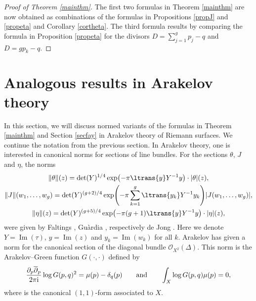 \documentclass[pdftex]{sigma}
\numberwithin{equation}{section}
\begin{document}
\begin{proof}[Proof of Theorem \ref{mainthm}]
	The first two formulas in Theorem \ref{mainthm} are now obtained as combinations of the formulas in Propositions \ref{propJ} and \ref{propeta} and Corollary \ref{cortheta}. The third formula results by comparing the formula in Proposition \ref{propeta} for the divisors $D=\sum_{j=1}^g p_j-q$ and $D=gp_k-q$.
\end{proof}

\section{Analogous results in Arakelov theory}\label{secarakelov}
In this section, we will discuss normed variants of the formulas in Theorem \ref{mainthm} and Section \ref{secfay} in Arakelov theory of Riemann surfaces. We continue the notation from the previous section.
In Arakelov theory, one is interested in canonical norms for sections of line bundles. For the sections $\theta$, $J$ and $\eta$, the norms
\begin{gather*}
\|\theta\|(z)=\det(Y)^{1/4}\exp\bigl(-\pi\ltrans{y}Y^{-1}y\bigr)\cdot |\theta|(z),\\
\|J\|(w_{1},\dots,w_{g})=\det(Y)^{(g+2)/4}\exp\Biggl(-\pi\sum_{k=1}^{g}\ltrans{y_{k}}Y^{-1}y_{k}\Biggr)|J(w_{1},\dots,w_{g})|,\\
\|\eta\|(z)=\det(Y)^{(g+5)/4}\exp\bigl(-\pi(g+1)\ltrans{y}Y^{-1}y\bigr)\cdot|\eta|(z),
\end{gather*}
were given by Faltings \cite[p.~401]{Fal84}, Gu\`ardia \cite[Definition 2.1]{Gua99}, respectively de Jong \cite[Section~2]{dJo08}. Here we denote $Y=\operatorname{Im}(\tau)$, $y=\operatorname{Im}(z)$ and $y_k=\operatorname{Im}(w_k)$ for all $k$.
Arakelov \cite{Ara74} has given a norm for the canonical section of the diagonal bundle $\mathcal{O}_{X^2}(\Delta)$. This norm is the Arakelov--Green function $G(\cdot,\cdot)$ defined by
\[\frac{\partial_{p}\overline{\partial}_{p}}{2\pi {\rm i}}\log G(p,q)^2=\mu(p)-\delta_q(p)\qquad\text{and}\qquad \int_{X}\log G(p,q)\mu(p)=0,\]
where  is the canonical $(1,1)$-form associated to $X$.
\end{document}

